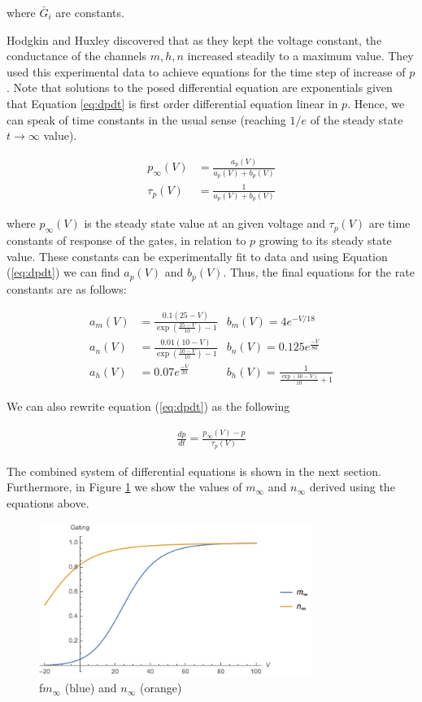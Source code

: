 \documentclass[12]{book}
\newcommand\0{\mathbf{0}}
\newcommand\<{\langle}
\renewcommand\>{\rangle}
\begin{document}
where $\bar{G}_i$ are constants.

Hodgkin and Huxley discovered that as they kept the voltage constant, the conductance of the channels $m, h, n$ increased steadily to a maximum value. They used this experimental data to achieve equations for the time step of increase of $p$. Note that solutions to the posed differential equation are exponentials given that Equation \ref{eq:dpdt} is first order differential equation linear in $p$. Hence, we can speak of time constants in the usual sense (reaching $1/e$ of the steady state $t \rightarrow \infty$ value).

\begin{align}
    p_{\infty}(V) &= \frac{a_p(V)}{a_p(V) + b_p(V)} \\
    \tau_p(V) &= \frac{1}{a_p(V) + b_p(V)} 
    \label{eq:time}
\end{align}

where $p_{\infty}(V)$ is the steady state value at an given voltage and ${\tau_p}(V)$ are time constants of response of the gates, in relation to $p$ growing to its steady state value. These constants can be experimentally fit to data and using Equation (\ref{eq:dpdt}) we can find $a_p(V)$ and $b_p(V)$. Thus, the final equations for the rate constants are as follows:

\begin{align*}
    a_m(V) &= \frac{0.1(25-V)}{\exp(\frac{25-V}{10})-1}
    &b_m(V) = 4e^{-V/18} \\
    a_n(V) &= \frac{0.01(10-V)}{\exp(\frac{10-V}{10})-1} 
    &b_n(V) = 0.125e^{\frac{-V}{80}}\\
    a_h(V) &= 0.07e^{\frac{-V}{20}} 
    &b_h(V) = \frac{1}{\frac{\exp(30-V)}{10}+1}
\end{align*}

We can also rewrite equation (\ref{eq:dpdt}) as the following

\begin{align*}
    \frac{dp}{dt} = \frac{p_{\infty}(V)-p}{\tau_p(V)}
\end{align*}

The combined system of differential equations is shown in the next section. Furthermore, in Figure \ref{fig:inf} we show the values of $m_\infty$ and $n_\infty$ derived using the equations above. 

\begin{figure}[h]
\centering
	\includegraphics[height=5cm]{gating.png}
	\caption{f$m_{\infty}$ (blue) and $n_{\infty}$ (orange)}
		\label{fig:inf}
\end{figure}
\end{document}
